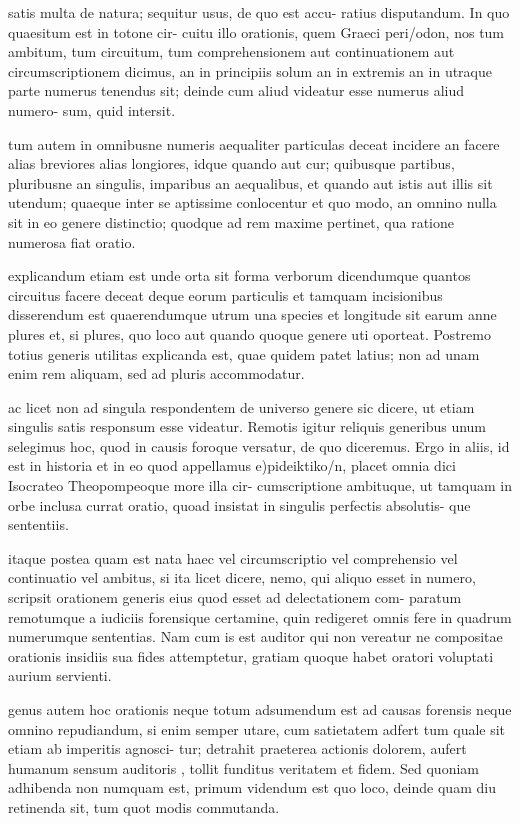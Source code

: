  satis multa de natura; sequitur usus, de quo est accu- ratius disputandum. In quo quaesitum est in totone cir- cuitu illo orationis, quem Graeci peri/odon, nos tum ambitum, tum circuitum, tum comprehensionem aut continuationem aut circumscriptionem dicimus, an in principiis solum an in extremis an in utraque parte numerus tenendus sit; deinde cum aliud videatur esse numerus aliud numero- sum, quid intersit.

 tum autem in omnibusne numeris aequaliter particulas deceat incidere an facere alias breviores alias longiores, idque quando aut cur; quibusque partibus, pluribusne an singulis, imparibus an aequalibus, et quando aut istis aut illis sit utendum; quaeque inter se aptissime conlocentur et quo modo, an omnino nulla sit in eo genere distinctio; quodque ad rem maxime pertinet, qua ratione numerosa fiat oratio.

 explicandum etiam est unde orta sit forma verborum dicendumque quantos circuitus facere deceat deque eorum particulis et tamquam incisionibus disserendum est quaerendumque utrum una species et longitude sit earum anne plures et, si plures, quo loco aut quando quoque genere uti oporteat. Postremo totius generis utilitas explicanda est, quae quidem patet latius; non ad unam enim rem aliquam, sed ad pluris accommodatur.

 ac licet non ad singula respondentem de universo genere sic dicere, ut etiam singulis satis responsum esse videatur. Remotis igitur reliquis generibus unum selegimus hoc, quod in causis foroque versatur, de quo diceremus. Ergo in aliis, id est in historia et in eo quod appellamus e)pideiktiko/n, placet omnia dici Isocrateo Theopompeoque more illa cir- cumscriptione ambituque, ut tamquam in orbe inclusa currat oratio, quoad insistat in singulis perfectis absolutis- que sententiis.

 itaque postea quam est nata haec vel circumscriptio vel comprehensio vel continuatio vel ambitus, si ita licet dicere, nemo, qui aliquo esset in numero, scripsit orationem generis eius quod esset ad delectationem com- paratum remotumque a iudiciis forensique certamine, quin redigeret omnis fere in quadrum numerumque sententias. Nam cum is est auditor qui non vereatur ne compositae orationis insidiis sua fides attemptetur, gratiam quoque habet oratori voluptati aurium servienti.

 genus autem hoc orationis neque totum adsumendum est ad causas forensis neque omnino repudiandum, si enim semper utare, cum satietatem adfert tum quale sit etiam ab imperitis agnosci- tur; detrahit praeterea actionis dolorem, aufert humanum sensum auditoris , tollit funditus veritatem et fidem. Sed quoniam adhibenda non numquam est, primum videndum est quo loco, deinde quam diu retinenda sit, tum quot modis commutanda.

